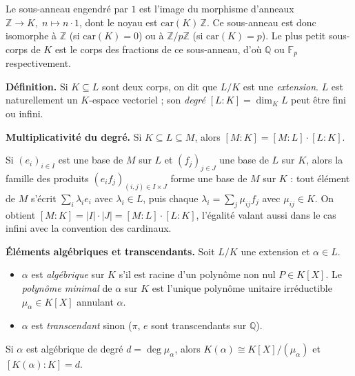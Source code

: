 \begin{significationintuitive}
  Le sous-anneau engendré par $1$ est l'image du morphisme d'anneaux
  $\mathbb{Z} \to K,\; n \mapsto n \cdot 1$, dont le noyau est $\mathrm{car}(K)\,\mathbb{Z}$.
  Ce sous-anneau est donc isomorphe à $\mathbb{Z}$ (si $\mathrm{car}(K) = 0$) ou à
  $\mathbb{Z}/p\mathbb{Z}$ (si $\mathrm{car}(K) = p$). Le plus petit sous-corps de $K$ est
  le corps des fractions de ce sous-anneau, d'où $\mathbb{Q}$ ou $\mathbb{F}_p$
  respectivement.
\end{significationintuitive}

\decsep{}


\begin{tcolorbox}[thmbox]
  \textbf{Définition.}\enspace%
  Si $K \subseteq L$ sont deux corps, on dit que $L/K$ est une \emph{extension}.
  $L$ est naturellement un $K$-espace vectoriel ; son \emph{degré}
  $[L:K] = \dim_K L$ peut être fini ou infini.

  \medskip
  \textbf{Multiplicativité du degré.}\enspace%
  Si $K \subseteq L \subseteq M$, alors $[M:K] = [M:L]\cdot[L:K]$.
\end{tcolorbox}

\begin{ideepreuve}
  Si $(e_i)_{i \in I}$ est une base de $M$ sur $L$ et $(f_j)_{j \in J}$ une base de
  $L$ sur $K$, alors la famille des produits $(e_i f_j)_{(i,j) \in I \times J}$ forme
  une base de $M$ sur $K$ : tout élément de $M$ s'écrit $\sum_i \lambda_i e_i$ avec
  $\lambda_i \in L$, puis chaque $\lambda_i = \sum_j \mu_{ij} f_j$ avec
  $\mu_{ij} \in K$. On obtient $[M:K] = |I|\cdot|J| = [M:L]\cdot[L:K]$, l'égalité
  valant aussi dans le cas infini avec la convention des cardinaux.
\end{ideepreuve}

\begin{tcolorbox}[thmbox]
  \textbf{Éléments algébriques et transcendants.}\enspace%
  Soit $L/K$ une extension et $\alpha \in L$.
  \begin{itemize}
    \item $\alpha$ est \emph{algébrique} sur $K$ s'il est racine d'un polynôme
          non nul $P \in K[X]$. Le \emph{polynôme minimal}
          de $\alpha$ sur $K$ est l'unique polynôme unitaire irréductible
          $\mu_\alpha \in K[X]$ annulant $\alpha$.
    \item $\alpha$ est \emph{transcendant} sinon ($\pi$, $e$ sont transcendants sur $\mathbb{Q}$).
  \end{itemize}
  Si $\alpha$ est algébrique de degré $d = \deg\mu_\alpha$, alors
  $K(\alpha) \cong K[X]/(\mu_\alpha)$ et $[K(\alpha):K] = d$.
\end{tcolorbox}

